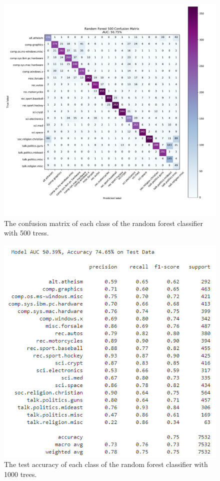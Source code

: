 \documentclass[twocolumn]{extarticle}
\begin{document}
\begin{appendices}
\begin{figure}[H]
\centering
\includegraphics[width=0.9\linewidth]{"charts/Random Forest 500"}
\caption{The confusion matrix of each class of the random forest classifier with 500 tress.}
\label{chart:random-forest-500-conf}
\end{figure}

\begin{figure}[H]
\centering
\includegraphics[width=0.9\linewidth]{charts/random-forest-1000-acc}
\caption{The test accuracy of each class of the random forest classifier with 1000 trees.}
\label{chart:random-forest-1000-acc}
\end{figure}


\end{appendices}
\end{document}
